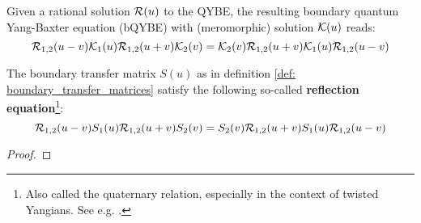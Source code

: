             \begin{definition} \label{def: boundary_quantum_yang_baxter_equations}
                Given a rational solution $\mathcal{R}(u)$ to the QYBE, the resulting boundary quantum Yang-Baxter equation (bQYBE) with (meromorphic) solution $\mathcal{K}(u)$ reads:
                    \begin{equation} \label{equation: boundary_quantum_yang_baxter_equations}
                        \mathcal{R}_{1, 2}(u - v) \mathcal{K}_1(u) \mathcal{R}_{1, 2}(u + v) \mathcal{K}_2(v) = \mathcal{K}_2(v) \mathcal{R}_{1, 2}(u + v) \mathcal{K}_1(u) \mathcal{R}_{1, 2}(u - v) 
                    \end{equation}
            \end{definition}
            \begin{lemma} \label{lemma: reflection_equations}
                The boundary transfer matrix $S(u)$ as in definition \ref{def: boundary_transfer_matrices} satisfy the following so-called \textbf{reflection equation}\footnote{Also called the quaternary relation, especially in the context of twisted Yangians. See e.g. \cite[Proposition 2.2.1]{molev_yangians_and_classical_lie_algebras}.}:
                    \begin{equation} \label{equation: reflection_equations}
                        \mathcal{R}_{1, 2}(u - v) S_1(u) \mathcal{R}_{1, 2}(u + v) S_2(v) = S_2(v) \mathcal{R}_{1, 2}(u + v) S_1(u) \mathcal{R}_{1, 2}(u - v) 
                    \end{equation}
            \end{lemma}
                \begin{proof}
                    
                \end{proof}
    
